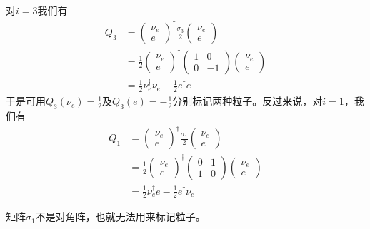 对$i=3$我们有
\begin{align}
Q_3&=\begin{pmatrix}\nu_e \\ e\end{pmatrix}^\dag\frac{\sigma_3}{2}\begin{pmatrix}\nu_e \\ e\end{pmatrix}\nonumber\\
&=\frac{1}{2}\begin{pmatrix}\nu_e \\ e\end{pmatrix}^\dag\begin{pmatrix}1 & 0 \\ 0 & -1\end{pmatrix}\begin{pmatrix}\nu_e \\ e\end{pmatrix}\nonumber\\
&=\frac{1}{2}\nu_e^\dag\nu_e - \frac{1}{2}e^\dag e
\label{equ7.134}
\end{align}
于是可用$Q_3(\nu_e)=\frac{1}{2}$及$Q_3(e)=-\frac{1}{2}$分别标记两种粒子。反过来说，对$i=1$，我们有
\begin{align}
Q_1&=\begin{pmatrix}\nu_e \\ e\end{pmatrix}^\dag\frac{\sigma_1}{2}\begin{pmatrix}\nu_e \\ e\end{pmatrix}\nonumber\\
&=\frac{1}{2}\begin{pmatrix}\nu_e \\ e\end{pmatrix}^\dag\begin{pmatrix}0  & 1 \\ 1 & 0 \end{pmatrix}\begin{pmatrix}\nu_e \\ e\end{pmatrix}\nonumber\\
&=\frac{1}{2}\nu_e^\dag e - \frac{1}{2}e^\dag \nu_e
\label{equ7.135}
\end{align}

矩阵$\sigma_1$不是对角阵，也就无法用来标记粒子。

